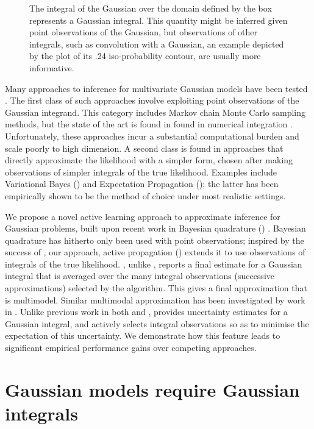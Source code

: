 \documentclass[twoside]{article}
\begin{document}
\begin{figure}
\caption{The integral of the Gaussian over the domain defined by the box represents a Gaussian integral. This quantity might be inferred given point observations of the Gaussian, but observations of other integrals, such as convolution with a Gaussian, an example depicted by the plot of its .24 iso-probability contour, are usually more informative.}
\label{fig:observations}
\end{figure}

Many approaches to inference for multivariate Gaussian models have been tested \citep{kuss2005assessing}. The first class of such approaches involve exploiting point observations of the Gaussian integrand. This category includes Markov chain Monte Carlo sampling methods, but the state of the art is found in found in numerical integration \citep{genz2009computation}. Unfortunately, these approaches incur a substantial computational burden and scale poorly to high dimension. A second class is found in approaches that directly approximate the likelihood with a simpler form, chosen after making observations of simpler integrals of the true likelihood. Examples include Variational Bayes (\vb) and Expectation Propagation \citep{minka2001expectation} (\ep); the latter has been empirically shown to be the method of choice \citep{nickisch2008approximations} under most realistic settings. 

We propose a novel active learning approach to approximate inference for Gaussian problems, built upon recent work in Bayesian quadrature (\bq) \citep{osborne2012active}. Bayesian quadrature has hitherto only been used with point observations; inspired by the success of \ep, our approach, active propagation (\ap) extends it to use observations of integrals of the true likelihood. \ap, unlike \ep, reports a final estimate for a Gaussian integral that is averaged over the many integral observations (successive approximations) selected by the algorithm. This gives a final approximation that is multimodel. Similar multimodal approximation has been investigated by work in \vb \citep{gershman2012nonparametric}. Unlike previous work in both \vb and \ep, \ap provides uncertainty estimates for a Gaussian integral, and actively selects integral observations so as to minimise the expectation of this uncertainty. We demonstrate how this feature leads \ap to significant empirical performance gains over competing approaches.

\section{Gaussian models require Gaussian integrals}
\end{document}

